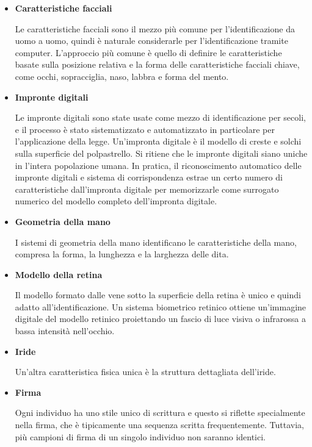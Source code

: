 \begin{itemize}
    \item \textbf{Caratteristiche facciali}
    
    Le caratteristiche facciali sono il mezzo più comune per l'identificazione da uomo a uomo, quindi è naturale considerarle per l'identificazione tramite computer. L'approccio più comune è quello di definire le caratteristiche basate sulla posizione relativa e la forma delle caratteristiche facciali chiave, come occhi, sopracciglia, naso, labbra e forma del mento.
    
    \item \textbf{Impronte digitali}
    
    Le impronte digitali sono state usate come mezzo di identificazione per secoli, e il processo è stato sistematizzato e automatizzato in particolare per l'applicazione della legge. Un'impronta digitale è il modello di creste e solchi sulla superficie del polpastrello. Si ritiene che le impronte digitali siano uniche in l'intera popolazione umana. In pratica, il riconoscimento automatico delle impronte digitali e sistema di corrispondenza estrae un certo numero di caratteristiche dall'impronta digitale per memorizzarle come surrogato numerico del modello completo dell'impronta digitale.
    
    \item \textbf{Geometria della mano}

    I sistemi di geometria della mano identificano le caratteristiche della mano, compresa la forma, la lunghezza e la larghezza delle dita.
    
    \item \textbf{Modello della retina}
    
    Il modello formato dalle vene sotto la superficie della retina è unico e quindi adatto all'identificazione. Un sistema biometrico retinico ottiene un'immagine digitale del modello retinico proiettando un fascio di luce visiva o infrarossa a bassa intensità nell'occhio.
    
    \item \textbf{Iride}
    
    Un'altra caratteristica fisica unica è la struttura dettagliata dell'iride.
    
    \item \textbf{Firma}
    
    Ogni individuo ha uno stile unico di scrittura e questo si riflette specialmente nella firma, che è tipicamente una sequenza scritta frequentemente. Tuttavia, più campioni di firma di un singolo individuo non saranno identici.
    

\end{itemize}
